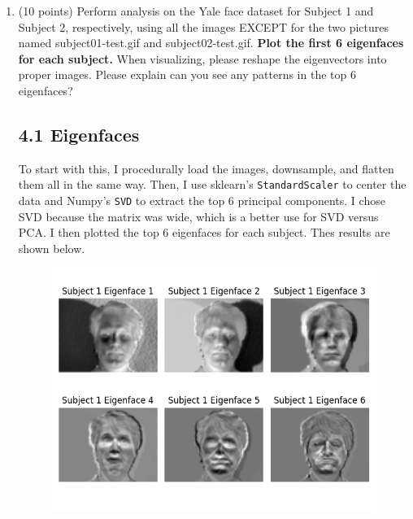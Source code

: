 \documentclass[twoside,10pt]{article}
\begin{document}
\begin{enumerate}

\item (10 points) Perform analysis on the Yale face dataset for Subject 1 and Subject 2, respectively, using all the images EXCEPT for the two pictures named \textsf{subject01-test.gif} and \textsf{subject02-test.gif}. {\bf Plot the first 6 eigenfaces for each subject.} When visualizing, please reshape the eigenvectors into proper images. Please explain can you see any patterns in the top 6 eigenfaces?
\subsection*{4.1 Eigenfaces}
To start with this, I procedurally load the images, downsample, and flatten them all in the same way. Then, I use sklearn's \lstinline{StandardScaler} to center the data and Numpy's \lstinline{SVD} to extract the top 6 principal components. I chose SVD because the matrix was wide, which is a better use for SVD versus PCA. I then plotted the top 6 eigenfaces for each subject. Thes results are shown below.
\begin{figure}[H]
                \centering
                \includegraphics[width=\textwidth]{images/eigenfaces_subject1.png}
                \label{fig:Eigenfaces_Subject1}
            \end{figure}
\begin{figure}[H]
                \centering

\end{figure}
\end{enumerate}
\end{document}
